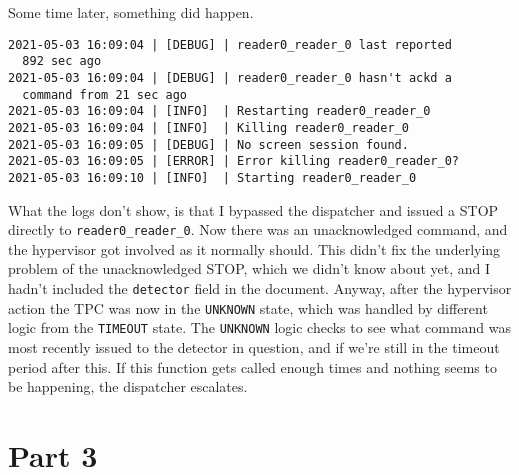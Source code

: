 Some time later, something did happen.
\begin{verbatim}
2021-05-03 16:09:04 | [DEBUG] | reader0_reader_0 last reported
  892 sec ago
2021-05-03 16:09:04 | [DEBUG] | reader0_reader_0 hasn't ackd a
  command from 21 sec ago
2021-05-03 16:09:04 | [INFO]  | Restarting reader0_reader_0
2021-05-03 16:09:04 | [INFO]  | Killing reader0_reader_0
2021-05-03 16:09:05 | [DEBUG] | No screen session found.
2021-05-03 16:09:05 | [ERROR] | Error killing reader0_reader_0?
2021-05-03 16:09:10 | [INFO]  | Starting reader0_reader_0
\end{verbatim}
What the logs don't show, is that I bypassed the dispatcher and issued a STOP directly to \texttt{reader0\_reader\_0}.
Now there was an unacknowledged command, and the hypervisor got involved as it normally should.
This didn't fix the underlying problem of the unacknowledged STOP, which we didn't know about yet, and I hadn't included the \texttt{detector} field in the document.
Anyway, after the hypervisor action the TPC was now in the \texttt{UNKNOWN} state, which was handled by different logic from the \texttt{TIMEOUT} state.
The \texttt{UNKNOWN} logic checks to see what command was most recently issued to the detector in question, and if we're still in the timeout period after this.
If this function gets called enough times and nothing seems to be happening, the dispatcher escalates.

\section{Part 3}

